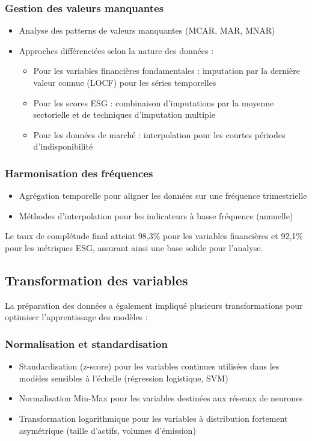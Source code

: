 \subsubsection{Gestion des valeurs manquantes}
\begin{itemize}
  \item Analyse des patterns de valeurs manquantes (MCAR, MAR, MNAR)
  \item Approches différenciées selon la nature des données :
  \begin{itemize}
    \item Pour les variables financières fondamentales : imputation par la dernière valeur connue (LOCF) pour les séries temporelles
    \item Pour les scores ESG : combinaison d'imputations par la moyenne sectorielle et de techniques d'imputation multiple
    \item Pour les données de marché : interpolation pour les courtes périodes d'indisponibilité
  \end{itemize}
\end{itemize}

\subsubsection{Harmonisation des fréquences}
\begin{itemize}
  \item Agrégation temporelle pour aligner les données sur une fréquence trimestrielle
  \item Méthodes d'interpolation pour les indicateurs à basse fréquence (annuelle)
\end{itemize}

Le taux de complétude final atteint 98,3\% pour les variables financières et 92,1\% pour les métriques ESG, assurant ainsi une base solide pour l'analyse.

\subsection{Transformation des variables}

La préparation des données a également impliqué plusieurs transformations pour optimiser l'apprentissage des modèles :

\subsubsection{Normalisation et standardisation}
\begin{itemize}
  \item Standardisation (z-score) pour les variables continues utilisées dans les modèles sensibles à l'échelle (régression logistique, SVM)
  \item Normalisation Min-Max pour les variables destinées aux réseaux de neurones
  \item Transformation logarithmique pour les variables à distribution fortement asymétrique (taille d'actifs, volumes d'émission)
\end{itemize}

